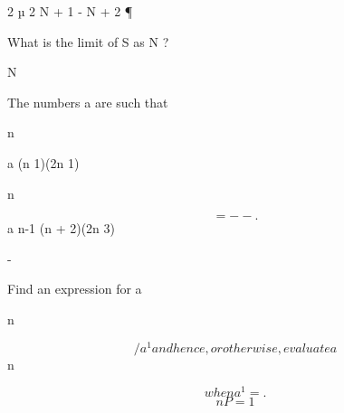 \documentclass[12pt]{article}
\begin{document}
\begin{flushleft}
2 µ 2 N + 1 - N + 2 ¶\par
What is the limit of S as N ?\par
N\par
\to \infty\par
The numbers a are such that\par
n\par
a (n 1)(2n 1)\par
n\par
\[= - - .\]
a n-1 (n + 2)(2n 3)\par
-\par
{}\par
Find an expression for a\par
n\par
\[/a^1 and hence, or otherwise, evaluate a\]
n\par
\[when a^1 = .\]
\[nP =1\]
\end{flushleft}
\end{document}

